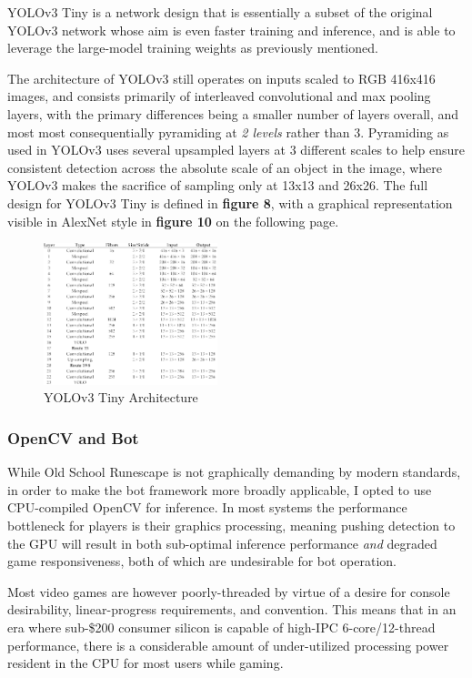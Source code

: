 \documentclass[sigconf]{acmart}
\begin{document}
YOLOv3 Tiny is a network design that is essentially a subset of the original YOLOv3 network whose aim is even faster training and inference, and is able to leverage the large-model training weights as previously mentioned.

The architecture of YOLOv3 still operates on inputs scaled to RGB 416x416 images, and consists primarily of interleaved convolutional and max pooling layers, with the primary differences being a smaller number of layers overall, and most most consequentially pyramiding at \textit{2 levels} rather than 3. Pyramiding as used in YOLOv3 uses several upsampled layers at 3 different scales to help ensure consistent detection across the absolute scale of an object in the image, where YOLOv3 makes the sacrifice of sampling only at 13x13 and 26x26. The full design for YOLOv3 Tiny is defined in \textbf{figure 8}, with a graphical representation visible in AlexNet style in \textbf{figure 10} on the following page.

\begin{figure}[h]
  \includegraphics[width=0.45\textwidth]{table.PNG}
  \caption{YOLOv3 Tiny Architecture}
  \label{fig:tinytable}
\end{figure}

\subsubsection{OpenCV and Bot}

While Old School Runescape is not graphically demanding by modern standards, in order to make the bot framework more broadly applicable, I opted to use CPU-compiled OpenCV for inference. In most systems the performance bottleneck for players is their graphics processing, meaning pushing detection to the GPU will result in both sub-optimal inference performance \textit{and} degraded game responsiveness, both of which are undesirable for bot operation. \cite{GN}

Most video games are however poorly-threaded by virtue of a desire for console desirability, linear-progress requirements, and convention. This means that in an era where sub-\$200 consumer silicon is capable of high-IPC 6-core/12-thread performance, there is a considerable amount of under-utilized processing power resident in the CPU for most users while gaming. \cite{GN}
\end{document}
